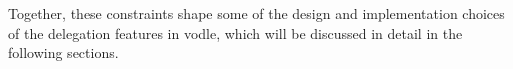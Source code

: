 Together, these constraints shape some of the design and implementation choices of the delegation features in vodle, which will be discussed in detail in the following sections.





